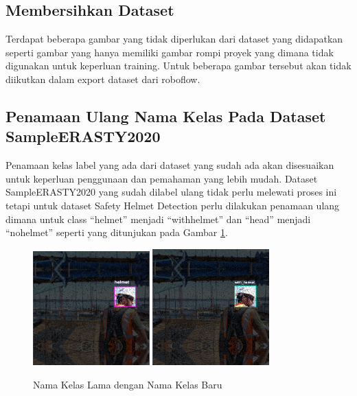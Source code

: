 \subsection{Membersihkan Dataset}
\par Terdapat beberapa gambar yang tidak diperlukan dari dataset yang didapatkan seperti gambar yang hanya memiliki gambar rompi proyek yang dimana tidak digunakan untuk keperluan training. Untuk beberapa gambar tersebut akan tidak diikutkan dalam export dataset dari roboflow.

\subsection{Penamaan Ulang Nama Kelas Pada Dataset SampleERASTY2020}
\par Penamaan kelas  label yang ada dari dataset yang sudah ada akan disesuaikan untuk keperluan penggunaan dan pemahaman yang lebih mudah. Dataset SampleERASTY2020 yang sudah dilabel ulang tidak perlu melewati proses ini tetapi untuk dataset Safety Helmet Detection perlu dilakukan penamaan ulang dimana untuk class “helmet” menjadi “with\textunderscore helmet” dan “head” menjadi “no\textunderscore helmet” seperti yang ditunjukan pada Gambar \ref{fig:prepro_classrename}. 

\begin{figure}[ht]
  \centering
  \includegraphics[width=0.4\textwidth]{gambar/reclass_old.png}
  \includegraphics[width=0.4\textwidth]{gambar/reclass_new.png}
  \caption{Nama Kelas Lama dengan Nama Kelas Baru}
  \label{fig:prepro_classrename}  
\end{figure}

